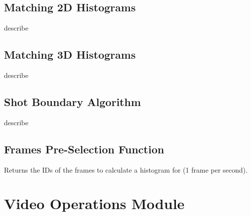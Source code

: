 


\subsection{Matching 2D Histograms}
\label{sec:code-match_2D_histograms}

describe




\subsection{Matching 3D Histograms}
\label{sec:code-match_3D_histograms}

describe




\subsection{Shot Boundary Algorithm}
\label{sec:code-shot_boundary_detection}

describe




\subsection{Frames Pre-Selection Function}
\label{sec:code-get_frames_to_process}

Returns the IDs of the frames to calculate a histogram for (1 frame per second).




\clearpage
\section{Video Operations Module}

